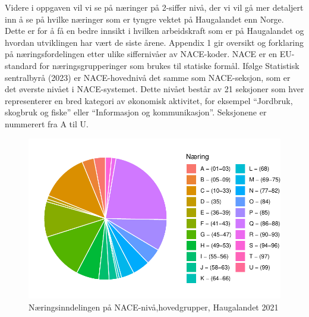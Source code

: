 \documentclass[
]{article}
\begin{document}
Videre i oppgaven vil vi se på næringer på 2-siffer nivå, der vi vil gå
mer detaljert inn å se på hvilke næringer som er tyngre vektet på
Haugalandet enn Norge. Dette er for å få en bedre innsikt i hvilken
arbeidskraft som er på Haugalandet og hvordan utviklingen har vært de
siste årene. Appendix 1 gir oversikt og forklaring på næringsfordelingen
etter ulike siffernivåer av NACE-koder. NACE er en EU-standard for
næringsgrupperinger som brukes til statiske formål. Ifølge Statistisk
sentralbyrå (2023) er NACE-hovednivå det samme som NACE-seksjon, som er
det øverste nivået i NACE-systemet. Dette nivået består av 21 seksjoner
som hver representerer en bred kategori av økonomisk aktivitet, for
eksempel ``Jordbruk, skogbruk og fiske'' eller ``Informasjon og
kommunikasjon''. Seksjonene er nummerert fra A til U.

\begin{figure}[H]

{\centering \includegraphics{Masteroppgave_files/figure-pdf/fig-kake-haugalandet-1.pdf}

}

\caption{\label{fig-kake-haugalandet}Næringsinndelingen på
NACE-nivå,hovedgrupper, Haugalandet 2021}

\end{figure}
\end{document}
